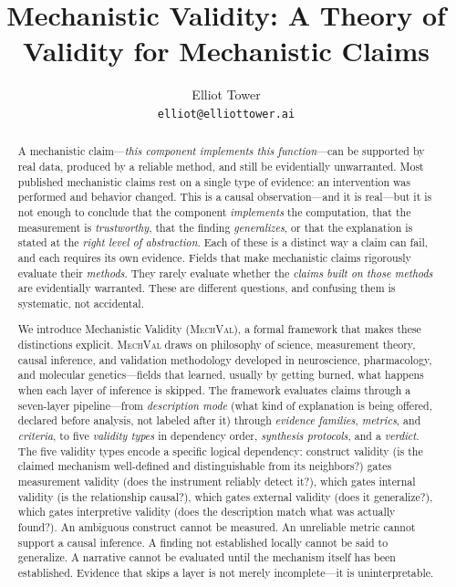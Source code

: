 \documentclass{article}
\title{Mechanistic Validity: A Theory of Validity for Mechanistic Claims}
\author{
Elliot Tower \\
\texttt{elliot@elliottower.ai}
}
\newcommand{\mechval}{\textsc{MechVal}}
\begin{document}
\maketitle

\begin{abstract}
A mechanistic claim---\emph{this component implements this function}---can be supported by real data, produced by a reliable method, and still be evidentially unwarranted. Most published mechanistic claims rest on a single type of evidence: an intervention was performed and behavior changed. This is a causal observation---and it is real---but it is not enough to conclude that the component \emph{implements} the computation, that the measurement is \emph{trustworthy}, that the finding \emph{generalizes}, or that the explanation is stated at the \emph{right level of abstraction}. Each of these is a distinct way a claim can fail, and each requires its own evidence. Fields that make mechanistic claims rigorously evaluate their \emph{methods}. They rarely evaluate whether the \emph{claims built on those methods} are evidentially warranted. These are different questions, and confusing them is systematic, not accidental.

We introduce Mechanistic Validity (\mechval{}), a formal framework that makes these distinctions explicit. \mechval{} draws on philosophy of science, measurement theory, causal inference, and validation methodology developed in neuroscience, pharmacology, and molecular genetics---fields that learned, usually by getting burned, what happens when each layer of inference is skipped. The framework evaluates claims through a seven-layer pipeline---from \emph{description mode} (what kind of explanation is being offered, declared before analysis, not labeled after it) through \emph{evidence families}, \emph{metrics}, and \emph{criteria}, to five \emph{validity types} in dependency order, \emph{synthesis protocols}, and a \emph{verdict}. The five validity types encode a specific logical dependency: construct validity (is the claimed mechanism well-defined and distinguishable from its neighbors?) gates measurement validity (does the instrument reliably detect it?), which gates internal validity (is the relationship causal?), which gates external validity (does it generalize?), which gates interpretive validity (does the description match what was actually found?). An ambiguous construct cannot be measured. An unreliable metric cannot support a causal inference. A finding not established locally cannot be said to generalize. A narrative cannot be evaluated until the mechanism itself has been established. Evidence that skips a layer is not merely incomplete---it is uninterpretable.


\end{abstract}
\end{document}

